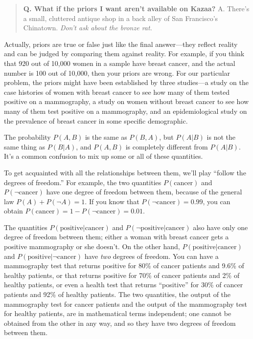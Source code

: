 {{\begin{quote}
{
 \textbf{Q. What if the priors I want aren't
available on Kazaa?}\newline
 A. There's a small, cluttered antique shop in a back
alley of San Francisco's Chinatown.
\textit{Don't ask about the bronze rat.}}
\end{quote}


{
 Actually, priors are true or false just like the final
answer---they reflect reality and can be judged by comparing them
against reality. For example, if you think that 920 out of 10,000 women
in a sample have breast cancer, and the actual number is 100 out of
10,000, then your priors are wrong. For our particular problem, the
priors might have been established by three studies---a study on the
case histories of women with breast cancer to see how many of them
tested positive on a mammography, a study on women without breast
cancer to see how many of them test positive on a mammography, and an
epidemiological study on the prevalence of breast cancer in some
specific demographic.}

\hr

{
 The probability $P(A,B)$ is the same as $P(B,A)$, but $P(A|B)$
is not the same thing as $P(B|A)$, and $P(A,B)$ is completely
different from $P(A|B)$. It's a common confusion
to mix up some or all of these quantities.}

{
 To get acquainted with all the relationships between them,
we'll play ``follow the degrees of
freedom.'' For example, the two quantities $P(\text{cancer})$
and $P(\lnot\text{cancer})$ have one degree of freedom between them,
because of the general law $P(A) + P(\lnot A) = 1$. If you know that
$P(\lnot\text{cancer}) = 0.99$, you can obtain $P(\text{cancer}) = 1 -
P(\lnot\text{cancer}) = 0.01$.}

{
 The quantities $P(\text{positive}|\text{cancer})$ and
$P(\lnot\text{positive}|\text{cancer})$ also have only one degree of
freedom between them; either a woman with breast cancer gets a positive
mammography or she doesn't. On the other hand,
$P(\text{positive}|\text{cancer})$ and $P(\text{positive}|\lnot\text{cancer})$
have \textit{two} degrees of freedom. You can have a mammography test
that returns positive for 80\% of cancer patients and 9.6\% of healthy
patients, or that returns positive for 70\% of cancer patients and 2\%
of healthy patients, or even a health test that returns
``positive'' for 30\% of cancer
patients and 92\% of healthy patients. The two quantities, the output
of the mammography test for cancer patients and the output of the
mammography test for healthy patients, are in mathematical terms
independent; one cannot be obtained from the other in any way, and so
they have two degrees of freedom between them.}

}}
